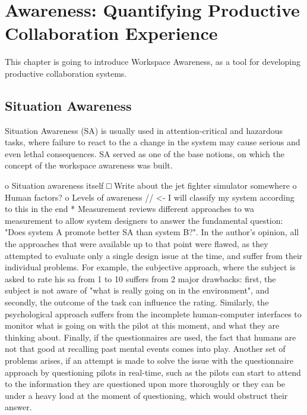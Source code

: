 
\chapter{Awareness: Quantifying Productive Collaboration Experience}

This chapter is going to introduce Workspace Awareness, as a tool for developing productive collaboration systems.

\section{Situation Awareness}

Situation Awareness (SA) is usually used in attention-critical and hazardous tasks, where failure to react to the a change in the system may cause serious and even lethal consequences. SA served as one of the base notions, on which the concept of the workspace awareness was built.

o Situation awareness itself
□ Write about the jet fighter simulator somewhere
o Human factors?
o Levels of awareness // <- I will classify my system according to this in the end
* Measurement
\cite[p.~791-792]{endsley_situation_1988} reviews different approaches to \gls{wa} measurement to allow system designers to answer the fundamental question: "Does system A promote better SA than system B?". In the author's opinion, all the approaches that were available up to that point were flawed, as they attempted to evaluate only a single design issue at the time, and suffer from their individual problems. For example, the subjective approach, where the subject is asked to rate his \gls{sa} from 1 to 10 suffers from 2 major drawbacks: first, the subject is not aware of "what is really going on in the environment", and secondly, the outcome of the task can influence the rating. Similarly, the psychological approach suffers from the incomplete human-computer interfaces to monitor what is going on with the pilot at this moment, and what they are thinking about. Finally, if the questionnaires are used, the fact that humans are not that good at recalling past mental events comes into play. Another set of problems arises, if an attempt is made to solve the issue with the questionnaire approach by questioning pilots in real-time, such as the pilots can start to attend to the information they are questioned upon more thoroughly or they can be under a heavy load at the moment of questioning, which would obstruct their answer.

